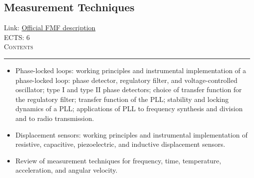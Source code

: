 \documentclass[11pt, a4paper]{article}
\newenvironment{course}[3]{
\subsection{#1}%
Link: \href{#2}{Official FMF description}\\%
ECTS: #3%
\vspace{1ex}
\\
{\large \textsc{Contents}}\\[-0.9ex]%
\rule{\textwidth}{0.5pt}
\vspace{-3ex}
}
{}
\newenvironment{chapter}[1]{
\begin{tcolorbox}[title=#1, breakable]
}
{\end{tcolorbox}}
\begin{document}
\begin{course}{Measurement Techniques}{https://www.fmf.uni-lj.si/en/study-physics/programmes/1fiz/2020/7000777/courses/1441/}{6}
\begin{chapter}{Important measurement techniques}
\begin{itemize}
            \item Phase-locked loops: working principles and instrumental implementation of a phase-locked loop: phase detector, regulatory filter, and voltage-controlled oscillator; type I and type II phase detectors; choice of transfer function for the regulatory filter; transfer function of the PLL; stability and locking dynamics of a PLL; applications of PLL to frequency synthesis and division and to radio transmission.

            \item Displacement sensors: working principles and instrumental implementation of resistive, capacitive, piezoelectric, and inductive displacement sensors.

            \item Review of measurement techniques for frequency, time, temperature, acceleration, and angular velocity.
        
        \end{itemize}
    \end{chapter}
\end{course}
\end{document}
